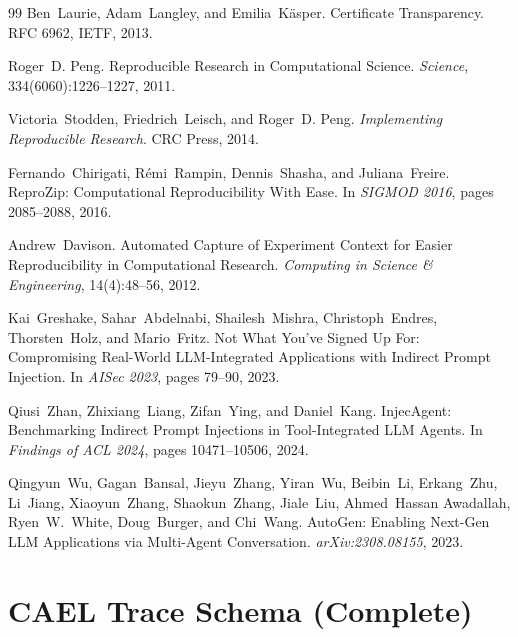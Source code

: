 \documentclass[letterpaper,twocolumn,10pt]{article}
\begin{document}
\begin{thebibliography}{99}
Ben~Laurie, Adam~Langley, and Emilia~K\"{a}sper.
\newblock Certificate Transparency.
\newblock RFC 6962, IETF, 2013.

Roger~D. Peng.
\newblock Reproducible Research in Computational Science.
\newblock \emph{Science}, 334(6060):1226--1227, 2011.

Victoria~Stodden, Friedrich~Leisch, and Roger~D. Peng.
\newblock \emph{Implementing Reproducible Research}.
\newblock CRC Press, 2014.

Fernando~Chirigati, R\'{e}mi~Rampin, Dennis~Shasha, and Juliana~Freire.
\newblock ReproZip: Computational Reproducibility With Ease.
\newblock In \emph{SIGMOD 2016}, pages 2085--2088, 2016.

Andrew~Davison.
\newblock Automated Capture of Experiment Context for Easier Reproducibility in Computational Research.
\newblock \emph{Computing in Science \& Engineering}, 14(4):48--56, 2012.

Kai~Greshake, Sahar~Abdelnabi, Shailesh~Mishra, Christoph~Endres, Thorsten~Holz, and Mario~Fritz.
\newblock Not What You've Signed Up For: Compromising Real-World LLM-Integrated Applications with Indirect Prompt Injection.
\newblock In \emph{AISec 2023}, pages 79--90, 2023.

Qiusi~Zhan, Zhixiang~Liang, Zifan~Ying, and Daniel~Kang.
\newblock InjecAgent: Benchmarking Indirect Prompt Injections in Tool-Integrated LLM Agents.
\newblock In \emph{Findings of ACL 2024}, pages 10471--10506, 2024.

Qingyun~Wu, Gagan~Bansal, Jieyu~Zhang, Yiran~Wu, Beibin~Li, Erkang~Zhu,
Li~Jiang, Xiaoyun~Zhang, Shaokun~Zhang, Jiale~Liu, Ahmed~Hassan Awadallah,
Ryen~W.~White, Doug~Burger, and Chi~Wang.
\newblock AutoGen: Enabling Next-Gen LLM Applications via Multi-Agent Conversation.
\newblock \emph{arXiv:2308.08155}, 2023.

\end{thebibliography}
\fi


\appendix

\section{CAEL Trace Schema (Complete)}
\label{app:schema}
\end{document}
